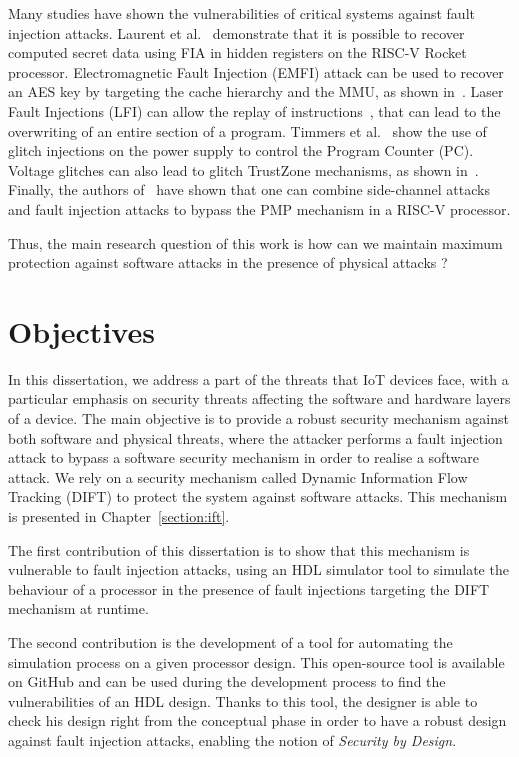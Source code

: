 Many studies have shown the vulnerabilities of critical systems against fault injection attacks.
Laurent et al.~\cite{LBDP-19-date} demonstrate that it is possible to recover computed secret data using FIA in hidden registers on the RISC-V Rocket processor. 
Electromagnetic Fault Injection (EMFI) attack can be used to recover an AES key by targeting the cache hierarchy and the MMU, as shown in~\cite{TBELB-21-jce}.
Laser Fault Injections (LFI) can allow the replay of instructions~\cite{KDD-21-dsd}, that can lead to the overwriting of an entire section of a program.
Timmers et al.~\cite{TSW-16-fdtc} show the use of glitch injections on the power supply to control the Program Counter (PC). Voltage glitches can also lead to glitch TrustZone mechanisms, as shown in~\cite{SMS-23-usenix}.
Finally, the authors of~\cite{NSUH-21-tches} have shown that one can combine side-channel attacks and fault injection attacks to bypass the PMP mechanism in a RISC-V processor.

Thus, the main research question of this work is how can we maintain maximum protection against software attacks in the presence of physical attacks ?

\section{Objectives}

In this dissertation, we address a part of the threats that IoT devices face, with a particular emphasis on security threats affecting the software and hardware layers of a device. The main objective is to provide a robust security mechanism against both software and physical threats, where the attacker performs a fault injection attack to bypass a software security mechanism in order to realise a software attack.
We rely on a security mechanism called Dynamic Information Flow Tracking (DIFT) to protect the system against software attacks. This mechanism is presented in Chapter~\ref{section:ift}.

The first contribution of this dissertation is to show that this mechanism is vulnerable to fault injection attacks, using an HDL simulator tool to simulate the behaviour of a processor in the presence of fault injections targeting the DIFT mechanism at runtime.

The second contribution is the development of a tool for automating the simulation process on a given processor design. This open-source tool is available on GitHub and can be used during the development process to find the vulnerabilities of an HDL design. Thanks to this tool, the designer is able to check his design right from the conceptual phase in order to have a robust design against fault injection attacks, enabling the notion of \textit{Security by Design}.

